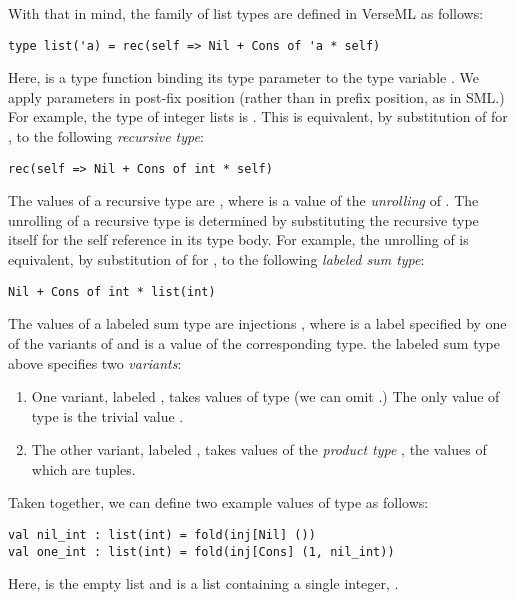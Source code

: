 With that in mind, the family of list types are defined in VerseML as follows:
\begin{lstlisting}[numbers=none]
type list('a) = rec(self => Nil + Cons of 'a * self)
\end{lstlisting}
Here,  is a {type function} binding its type parameter to the type variable . We apply parameters in post-fix position (rather than in prefix position, as in SML.) For example, the type of integer lists is . This is equivalent, by substitution of  for , to the following \emph{recursive type}:
\begin{lstlisting}[numbers=none]
rec(self => Nil + Cons of int * self)
\end{lstlisting}

The values of a recursive type  are , where  is a value of the \emph{unrolling} of . The {unrolling} of a recursive type is determined by substituting the recursive type itself for the self reference in its type body. For example, the unrolling of  is equivalent, by substitution of  for , to the following \emph{labeled sum type}:
\begin{lstlisting}[numbers=none]
Nil + Cons of int * list(int)
\end{lstlisting}
The values of a labeled sum type  are injections , where  is a label specified by one of the variants of  and  is a value of the corresponding type. the {labeled sum type} above specifies two \emph{variants}:
\begin{enumerate}
\item One variant, labeled , takes values of  type (we can omit .) The only value of  type is the trivial value \li{()}.  
\item The other variant, labeled , takes values of the \emph{product type} , the values of which are tuples. 
\end{enumerate}

Taken together, we can define two example values of type  as follows:
\begin{lstlisting}[numbers=none]
val nil_int : list(int) = fold(inj[Nil] ())
val one_int : list(int) = fold(inj[Cons] (1, nil_int))
\end{lstlisting}
Here,  is the empty list and  is a list containing a single integer, . %

